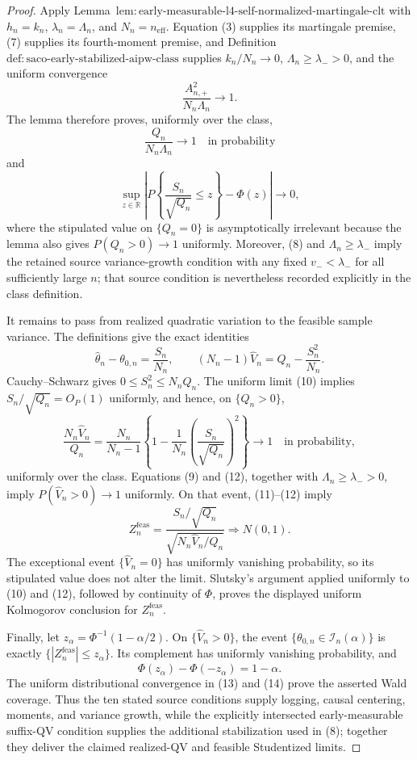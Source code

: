 \documentclass{article}
\begin{document}
\begin{proof}
Apply Lemma~\(\mathrm{lem:early\text{-}measurable\text{-}l4\text{-}self\text{-}normalized\text{-}martingale\text{-}clt}\) with \(h_n=k_n\), \(\lambda_n=\Lambda_n\), and \(N_n=n_{\mathrm{eff}}\).  Equation (3) supplies its martingale premise, (7) supplies its fourth-moment premise, and Definition~\(\mathrm{def:saco\text{-}early\text{-}stabilized\text{-}aipw\text{-}class}\) supplies \(k_n/N_n\to0\), \(\Lambda_n\ge\lambda_->0\), and the uniform convergence
\[
\frac{A_{n,+}^2}{N_n\Lambda_n}\longrightarrow1.
\tag{8}
\]
The lemma therefore proves, uniformly over the class,
\[
\frac{Q_n}{N_n\Lambda_n}\longrightarrow1
\quad\text{in probability}
\tag{9}
\]
and
\[
\sup_{z\in\mathbb R}
\left|P\left\{\frac{S_n}{\sqrt{Q_n}}\le z\right\}-\Phi(z)\right|
\longrightarrow0,
\tag{10}
\]
where the stipulated value on \(\{Q_n=0\}\) is asymptotically irrelevant because the lemma also gives \(P(Q_n>0)\to1\) uniformly.  Moreover, (8) and \(\Lambda_n\ge\lambda_-\) imply the retained source variance-growth condition with any fixed \(v_-<\lambda_-\) for all sufficiently large \(n\); that source condition is nevertheless recorded explicitly in the class definition.

It remains to pass from realized quadratic variation to the feasible sample variance.  The definitions give the exact identities
\[
\widehat\theta_n-\theta_{0,n}=\frac{S_n}{N_n},
\qquad
(N_n-1)\widehat V_n=Q_n-\frac{S_n^2}{N_n}.
\tag{11}
\]
Cauchy--Schwarz gives \(0\le S_n^2\le N_nQ_n\).  The uniform limit (10) implies \(S_n/\sqrt{Q_n}=O_P(1)\) uniformly, and hence, on \(\{Q_n>0\}\),
\[
\frac{N_n\widehat V_n}{Q_n}
=\frac{N_n}{N_n-1}
\left\{1-\frac1{N_n}\left(\frac{S_n}{\sqrt{Q_n}}\right)^2\right\}
\longrightarrow1
\quad\text{in probability},
\tag{12}
\]
uniformly over the class.  Equations (9) and (12), together with \(\Lambda_n\ge\lambda_->0\), imply \(P(\widehat V_n>0)\to1\) uniformly.  On that event, (11)--(12) imply
\[
Z_n^{\mathrm{feas}}
=\frac{S_n/\sqrt{Q_n}}
{\sqrt{N_n\widehat V_n/Q_n}}
\Rightarrow N(0,1).
\tag{13}
\]
The exceptional event \(\{\widehat V_n=0\}\) has uniformly vanishing probability, so its stipulated value does not alter the limit.  Slutsky's argument applied uniformly to (10) and (12), followed by continuity of \(\Phi\), proves the displayed uniform Kolmogorov conclusion for \(Z_n^{\mathrm{feas}}\).

Finally, let \(z_\alpha=\Phi^{-1}(1-\alpha/2)\).  On \(\{\widehat V_n>0\}\), the event \(\{\theta_{0,n}\in\mathcal I_n(\alpha)\}\) is exactly \(\{|Z_n^{\mathrm{feas}}|\le z_\alpha\}\).  Its complement has uniformly vanishing probability, and
\[
\Phi(z_\alpha)-\Phi(-z_\alpha)=1-\alpha.
\tag{14}
\]
The uniform distributional convergence in (13) and (14) prove the asserted Wald coverage.  Thus the ten stated source conditions supply logging, causal centering, moments, and variance growth, while the explicitly intersected early-measurable suffix-QV condition supplies the additional stabilization used in (8); together they deliver the claimed realized-QV and feasible Studentized limits.
\end{proof}
\end{document}
